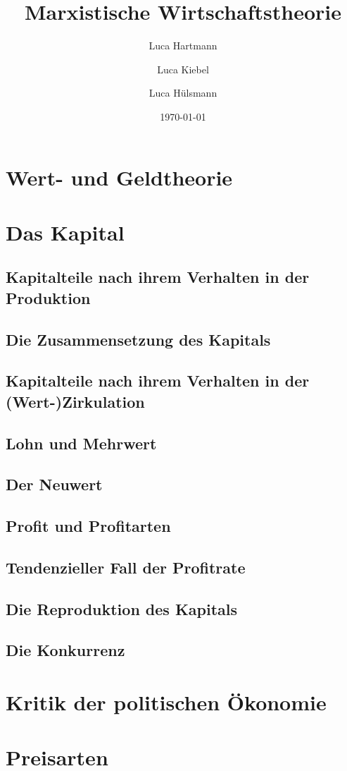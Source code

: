 \documentclass[10pt,a4paper, ngerman]{beamer}
\author{Luca Hartmann \and Luca Kiebel \and Luca Hülsmann}
\title{Marxistische Wirtschaftstheorie}
\date{\today}
\institute[HBBK]{Hans-Böckler-Berufskolleg}
\begin{document}
\begin{frame}
\titlepage
\end{frame}

\section{Wert- und Geldtheorie}

\section{Das Kapital}
\subsection{Kapitalteile nach ihrem Verhalten in der Produktion}
\subsection{Die Zusammensetzung des Kapitals}
\subsection{Kapitalteile nach ihrem Verhalten in der (Wert-)Zirkulation}
\subsection{Lohn und Mehrwert}
\subsection{Der Neuwert}
\subsection{Profit und Profitarten}
\subsection{Tendenzieller Fall der Profitrate}
\subsection{Die Reproduktion des Kapitals}
\subsection{Die Konkurrenz}


\section{Kritik der politischen Ökonomie}

\section{Preisarten}
\end{document}
